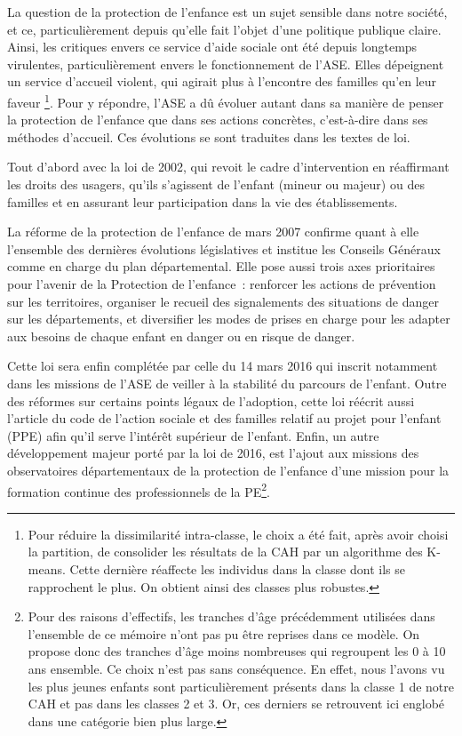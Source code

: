 \documentclass[
  12,
  a4paper,
]{report}
\begin{document}
La question de la protection de l'enfance est un sujet sensible dans
notre société, et ce, particulièrement depuis qu'elle fait l'objet d'une
politique publique claire. Ainsi, les critiques envers ce service d'aide
sociale ont été depuis longtemps virulentes, particulièrement envers le
fonctionnement de l'ASE. Elles dépeignent un service d'accueil violent,
qui agirait plus à l'encontre des familles qu'en leur faveur
\footnote{Pour réduire la dissimilarité intra-classe, le choix a été
  fait, après avoir choisi la partition, de consolider les résultats de
  la CAH par un algorithme des K-means. Cette dernière réaffecte les
  individus dans la classe dont ils se rapprochent le plus. On obtient
  ainsi des classes plus robustes.}. Pour y répondre, l'ASE a dû évoluer
autant dans sa manière de penser la protection de l'enfance que dans ses
actions concrètes, c'est-à-dire dans ses méthodes d'accueil. Ces
évolutions se sont traduites dans les textes de loi.

Tout d'abord avec la loi de 2002, qui revoit le cadre d'intervention en
réaffirmant les droits des usagers, qu'ils s'agissent de l'enfant
(mineur ou majeur) ou des familles et en assurant leur participation
dans la vie des établissements.

La réforme de la protection de l'enfance de mars 2007 confirme quant à
elle l'ensemble des dernières évolutions législatives et institue les
Conseils Généraux comme en charge du plan départemental. Elle pose aussi
trois axes prioritaires pour l'avenir de la Protection de l'enfance~:
renforcer les actions de prévention sur les territoires, organiser le
recueil des signalements des situations de danger sur les départements,
et diversifier les modes de prises en charge pour les adapter aux
besoins de chaque enfant en danger ou en risque de danger.

Cette loi sera enfin complétée par celle du 14 mars 2016 qui inscrit
notamment dans les missions de l'ASE de veiller à la stabilité du
parcours de l'enfant. Outre des réformes sur certains points légaux de
l'adoption, cette loi réécrit aussi l'article du code de l'action
sociale et des familles relatif au projet pour l'enfant (PPE) afin qu'il
serve l'intérêt supérieur de l'enfant. Enfin, un autre développement
majeur porté par la loi de 2016, est l'ajout aux missions des
observatoires départementaux de la protection de l'enfance d'une mission
pour la formation continue des professionnels de la PE\footnote{Pour des
  raisons d'effectifs, les tranches d'âge précédemment utilisées dans
  l'ensemble de ce mémoire n'ont pas pu être reprises dans ce modèle. On
  propose donc des tranches d'âge moins nombreuses qui regroupent les 0
  à 10 ans ensemble. Ce choix n'est pas sans conséquence. En effet, nous
  l'avons vu les plus jeunes enfants sont particulièrement présents dans
  la classe 1 de notre CAH et pas dans les classes 2 et 3. Or, ces
  derniers se retrouvent ici englobé dans une catégorie bien plus large.}.
\end{document}
